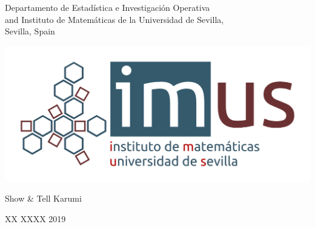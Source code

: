 \documentclass[11pt,a4paper,xcolor=dvipsnames, leqno]{beamer}
\begin{document}
\begingroup 
    \begin{frame}
        \titlepage
\begin{center}
\insertauthor\par
\end{center}
\begin{center}
        \scriptsize Departamento de Estad\'istica e Investigaci\'on Operativa\\ and Instituto de Matem\'aticas de la Universidad de Sevilla,\\
        Sevilla, Spain
        \end{center}
\begin{center}
\LARGE {}
\end{center}
\begin{center}
\includegraphics[scale=0.35]{imus_basico_oct.png}
\end{center}
\begin{center}
\scriptsize{Show \& Tell Karumi}
\end{center}
\begin{center}
\footnotesize{XX XXXX 2019}
\end{center}
\end{frame}
\endgroup
\end{document}
